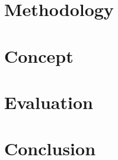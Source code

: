 \section{Methodology}\label{sec:method}

\section{Concept}\label{sec:concept}

\section{Evaluation}\label{sec:evaluation}

\section{Conclusion}\label{sec:conclusion}
